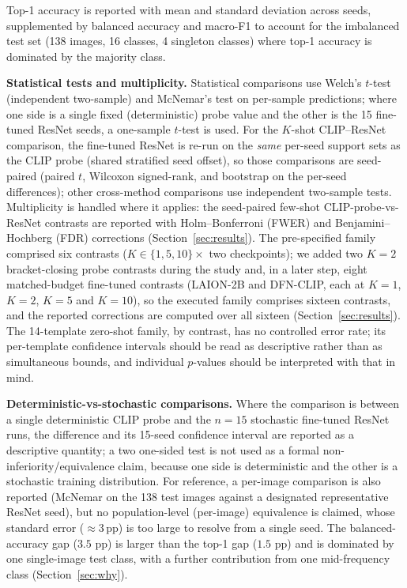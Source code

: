 \documentclass[10pt,a4paper]{article}
\begin{document}
Top-1 accuracy is reported with mean and standard deviation across seeds, supplemented by balanced accuracy and macro-F1 to account for the imbalanced test set (138 images, 16 classes, 4 singleton classes) where top-1 accuracy is dominated by the majority class.

\textbf{Statistical tests and multiplicity.} Statistical comparisons use Welch's $t$-test (independent two-sample) and McNemar's test on per-sample predictions; where one side is a single fixed (deterministic) probe value and the other is the 15 fine-tuned ResNet seeds, a one-sample $t$-test is used. For the $K$-shot CLIP--ResNet comparison, the fine-tuned ResNet is re-run on the \emph{same} per-seed support sets as the CLIP probe (shared stratified seed offset), so those comparisons are seed-paired (paired $t$, Wilcoxon signed-rank, and bootstrap on the per-seed differences); other cross-method comparisons use independent two-sample tests. Multiplicity is handled where it applies: the seed-paired few-shot CLIP-probe-vs-ResNet contrasts are reported with Holm--Bonferroni (FWER) and Benjamini--Hochberg (FDR) corrections (Section~\ref{sec:results}). The pre-specified family comprised six contrasts ($K\in\{1,5,10\}\times$ two checkpoints); we added two $K{=}2$ bracket-closing probe contrasts during the study and, in a later step, eight matched-budget fine-tuned contrasts (LAION-2B and DFN-CLIP, each at $K{=}1$, $K{=}2$, $K{=}5$ and $K{=}10$), so the executed family comprises sixteen contrasts, and the reported corrections are computed over all sixteen (Section~\ref{sec:results}). The 14-template zero-shot family, by contrast, has no controlled error rate; its per-template confidence intervals should be read as descriptive rather than as simultaneous bounds, and individual $p$-values should be interpreted with that in mind.

\textbf{Deterministic-vs-stochastic comparisons.} Where the comparison is between a single deterministic CLIP probe and the $n{=}15$ stochastic fine-tuned ResNet runs, the difference and its 15-seed confidence interval are reported as a descriptive quantity; a two one-sided test is not used as a formal non-inferiority/equivalence claim, because one side is deterministic and the other is a stochastic training distribution. For reference, a per-image comparison is also reported (McNemar on the 138 test images against a designated representative ResNet seed), but no population-level (per-image) equivalence is claimed, whose standard error ($\approx$3\,pp) is too large to resolve from a single seed. The balanced-accuracy gap ($3.5$ pp) is larger than the top-1 gap ($1.5$ pp) and is dominated by one single-image test class, with a further contribution from one mid-frequency class (Section~\ref{sec:why}).
\end{document}
